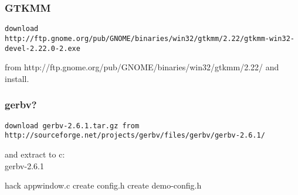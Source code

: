 \documentclass[a4paper,11pt]{article}  %
\begin{document}
\subsubsection{GTKMM}
\begin{lstlisting}[frame=single,breaklines=true]
download http://ftp.gnome.org/pub/GNOME/binaries/win32/gtkmm/2.22/gtkmm-win32-devel-2.22.0-2.exe
\end{lstlisting}
from http://ftp.gnome.org/pub/GNOME/binaries/win32/gtkmm/2.22/
and install.

\subsubsection{gerbv?}
\begin{lstlisting}[frame=single,breaklines=true]
download gerbv-2.6.1.tar.gz from http://sourceforge.net/projects/gerbv/files/gerbv/gerbv-2.6.1/
\end{lstlisting}
and extract to c:\\gerbv-2.6.1

hack appwindow.c
create config.h
create demo-config.h
\end{document}
